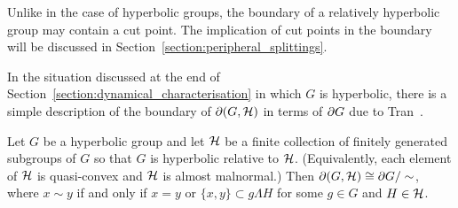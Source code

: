 Unlike in the case of hyperbolic groups, the boundary of a relatively hyperbolic group may contain a cut point.
The implication of cut points in the boundary will be discussed in Section~\ref{section:peripheral_splittings}.

In the situation discussed at the end of Section~\ref{section:dynamical_characterisation} in which $G$ is hyperbolic, there is a simple description of the boundary of $\partial(G,\mathcal{H})$ in terms of $\partial G$ due to Tran~\cite{tran13}.

\begin{theorem}\label{theorem:bowditch_from_gromov}
  Let $G$ be a hyperbolic group and let $\mathcal{H}$ be a finite collection of finitely generated subgroups of $G$ so that $G$ is hyperbolic relative to $\mathcal{H}$.
  (Equivalently, each element of $\mathcal{H}$ is quasi-convex and $\mathcal{H}$ is almost malnormal.)
  Then $\partial(G, \mathcal{H}) \cong \partial G/\sim$, where $x \sim y$ if and only if $x = y$ or $\{x, y\} \subset g\Lambda H$ for some $g \in G$ and $H \in \mathcal{H}$.
\end{theorem}

